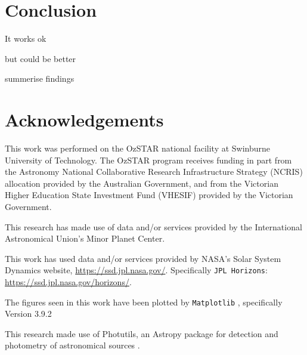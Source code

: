 \documentclass{UCreport}
\begin{document}

\section{Conclusion}\label{Sec:Conc}

It works ok

but could be better

summerise findings

\newpage %

\section*{Acknowledgements}
\small
This work was performed on the OzSTAR national facility at Swinburne University of Technology.
The OzSTAR program receives funding in part from the Astronomy National Collaborative Research Infrastructure Strategy (NCRIS) allocation provided by the Australian Government, and from the Victorian Higher Education State Investment Fund (VHESIF) provided by the Victorian Government.

This research has made use of data and/or services provided by the International Astronomical Union's Minor Planet Center.

This work has used data and/or services provided by NASA's Solar System Dynamics website, \url{https://ssd.jpl.nasa.gov/}. Specifically \texttt{JPL Horizons}: \url{https://ssd.jpl.nasa.gov/horizons/}.

The figures seen in this work have been plotted by \texttt{Matplotlib} \citep{Hunter2007}, specifically Version 3.9.2 \citep{PLT3.9.2}

This research made use of Photutils, an Astropy package for detection and photometry of astronomical sources \citep{Bradley2024}.

% 

\end{document}
